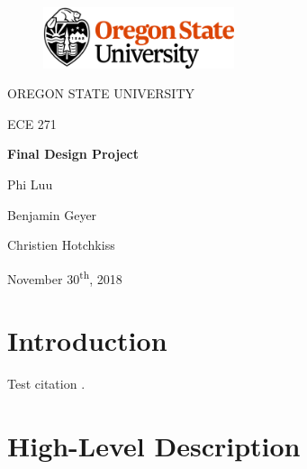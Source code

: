 \documentclass[12pt]{article}
\begin{document}
\begin{titlepage}
  \begin{center} \LARGE
    \begin{figure}[ht]
      \centering
      \includegraphics[width=0.5\textwidth]{osu_logo.png}
    \end{figure}

    \vspace{0.25in}

    OREGON STATE UNIVERSITY

    \vspace{0.25in}

    ECE 271

    \vfill

    \textbf{Final Design Project}

    \vspace{0.25in}

    Phi Luu

    Benjamin Geyer

    Christien Hotchkiss

    \vfill

    November 30\textsuperscript{th}, 2018
  \end{center}
\end{titlepage}

\tableofcontents \newpage

\section{Introduction}

Test citation \cite{SparkFunSpi}.

\section{High-Level Description}

\end{document}
